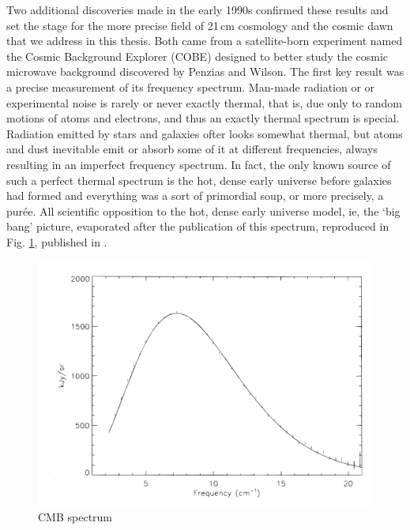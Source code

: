 Two additional discoveries made in the early 1990s confirmed these results and set the stage for the more precise field of 21\,cm cosmology and the cosmic dawn that we address in this thesis. Both came from a satellite-born experiment named the Cosmic Background Explorer (COBE) designed to better study the cosmic microwave background discovered by Penzias and Wilson. The first key result was a precise measurement of its frequency spectrum. Man-made radiation or or experimental noise is rarely or never exactly thermal, that is, due only to random motions of atoms and electrons, and thus an exactly thermal spectrum is special. Radiation emitted by stars and galaxies ofter looks somewhat thermal, but atoms and dust inevitable emit or absorb some of it at different frequencies, always resulting in an imperfect frequency spectrum. In fact, the only known source of such a perfect thermal spectrum is the hot, dense early universe before galaxies had formed and everything was a sort of primordial soup, or more precisely, a purée. All scientific opposition to the hot, dense early universe model, ie, the `big bang' picture, evaporated after the publication of this spectrum, reproduced in Fig. \ref{fig:cobecmbspectrum}, published in \citep{cobespectrum,cobespectrum2}.

\begin{figure}
\includegraphics[width=6in]{cocktail_party_intro/cobe_cmb_spectrum.png}
\caption{CMB spectrum}
\label{fig:cobecmbspectrum}
\end{figure}


